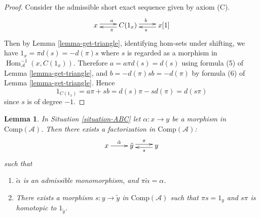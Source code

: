 \documentclass{stacks-project}
\theoremstyle{plain}
\newtheorem{lemma}[subsection]{Lemma}
\theoremstyle{definition}
\theoremstyle{remark}
\numberwithin{equation}{subsection}
\def\Hom{\mathop{\mathrm{Hom}}\nolimits}
\begin{document}
\begin{proof}
Consider the admissible short exact sequence given by axiom (C).
$$
\xymatrix{
x \ar@<0.5ex>[r]^a  &
C(1_x) \ar@<0.5ex>[l]^{\pi} \ar@<0.5ex>[r]^b &
x[1]\ar@<0.5ex>[l]^s
}
$$
Then by Lemma \ref{lemma-get-triangle}, identifying hom-sets under
shifting, we have $1_x=\pi d(s)=-d(\pi)s$ where $s$ is regarded as
a morphism in $\Hom_{\mathcal{A}}^{-1}(x,C(1_x))$. Therefore
$a=a\pi d(s)=d(s)$ using formula (5) of Lemma \ref{lemma-get-triangle},
and $b=-d(\pi)sb=-d(\pi)$ by formula (6) of Lemma \ref{lemma-get-triangle}.
Hence
$$
1_{C(1_x)} = a\pi + sb = d(s)\pi - sd(\pi) = d(s\pi)
$$
since $s$ is of degree $-1$.
\end{proof}

\begin{lemma}
\label{lemma-factor}
In Situation \ref{situation-ABC} let $\alpha : x \to y$
be a morphism in $\text{Comp}(\mathcal{A})$. Then there exists
a factorization in $\text{Comp}(\mathcal{A})$:
$$
\xymatrix{
x \ar[r]^{\tilde{\alpha}}  &
\tilde{y} \ar@<0.5ex>[r]^{\pi} &
y\ar@<0.5ex>[l]^s
}
$$
such that
\begin{enumerate}
\item $\tilde{\alpha}$ is an admissible monomorphism, and
$\pi\tilde{\alpha}=\alpha$.
\item There exists a morphism
$s:y\to\tilde{y}$ in $\text{Comp}(\mathcal{A})$
such that $\pi s=1_y$ and $s\pi$ is homotopic to $1_{\tilde{y}}$. 
\end{enumerate}
\end{lemma}
\end{document}
